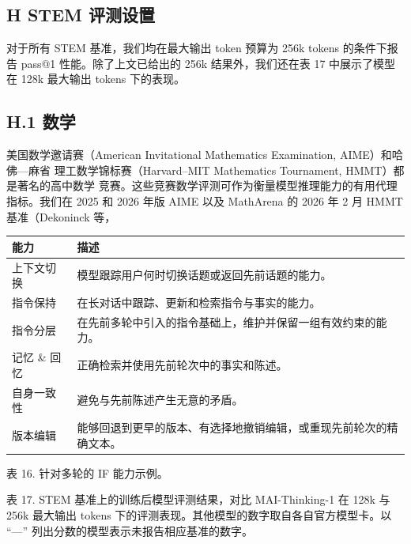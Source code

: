 \subsection{H STEM 评测设置}\label{h-stem-evaluations-setup}

对于所有 STEM 基准，我们均在最大输出 token 预算为 256k tokens 的条件下报告
pass@1 性能。除了上文已给出的 256k 结果外，我们还在表 17 中展示了模型在 128k
最大输出 tokens 下的表现。

\subsection{H.1 数学}\label{h.1-math}

美国数学邀请赛（American Invitational Mathematics Examination, AIME）和哈佛---麻省
理工数学锦标赛（Harvard--MIT Mathematics Tournament, HMMT）都是著名的高中数学
竞赛。这些竞赛数学评测可作为衡量模型推理能力的有用代理指标。我们在 2025 和 2026
年版 AIME 以及 MathArena 的 2026 年 2 月 HMMT 基准（Dekoninck 等，



{\def\LTcaptype{none} %
\begin{longtable}[]{@{}|l|l|@{}}
\toprule\noalign{}
\endhead
\bottomrule\noalign{}
\endlastfoot
\hline
能力 & 描述 \\
\hline
上下文切换 & 模型跟踪用户何时切换话题或返回先前话题的能力。 \\
\hline
指令保持 & 在长对话中跟踪、更新和检索指令与事实的能力。 \\
\hline
指令分层 & 在先前多轮中引入的指令基础上，维护并保留一组有效约束的能力。 \\
\hline
记忆 \& 回忆 & 正确检索并使用先前轮次中的事实和陈述。 \\
\hline
自身一致性 & 避免与先前陈述产生无意的矛盾。 \\
\hline
版本编辑 & 能够回退到更早的版本、有选择地撤销编辑，或重现先前轮次的精确文本。 \\
\hline
\end{longtable}
}

表 16. 针对多轮的 IF 能力示例。

表 17. STEM 基准上的训练后模型评测结果，对比 MAI-Thinking-1 在 128k 与 256k
最大输出 tokens 下的评测表现。其他模型的数字取自各自官方模型卡。以 ``---''
列出分数的模型表示未报告相应基准的数字。

